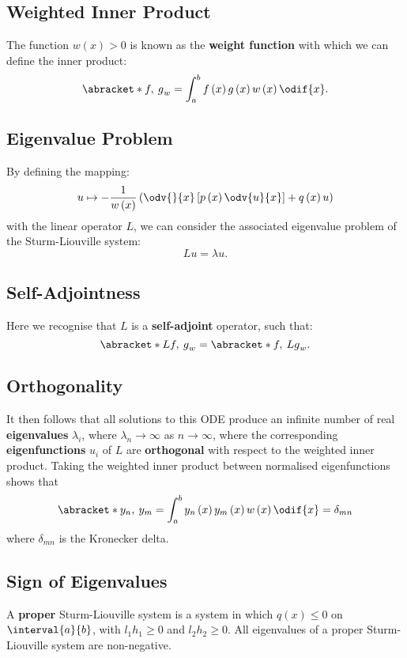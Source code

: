 \documentclass{article}
\begin{document}
\subsection{Weighted Inner Product}
The function \(w\left( x \right) > 0\) is known as the \textbf{weight
function} with which we can define the inner product:
\begin{equation*}
    \abracket*{f,\: g}_{w} = \int_a^b f\left( x \right) g\left( x \right) w\left( x \right) \odif{x}.
\end{equation*}
\subsection{Eigenvalue Problem}
By defining the mapping:
\begin{equation*}
    u \mapsto - \frac{1}{w\left( x \right)} \left( \odv{}{x} \left[ p\left( x \right) \odv{u}{x} \right] + q\left( x \right) u \right)
\end{equation*}
with the linear operator \(L\), we can consider the associated eigenvalue problem of
the Sturm-Liouville system:
\begin{equation*}
    L u = \lambda u.
\end{equation*}
\subsection{Self-Adjointness}
Here we recognise that \(L\) is a \textbf{self-adjoint} operator, such
that:
\begin{equation*}
    \abracket*{Lf,\: g}_{w} = \abracket*{f,\: Lg}_{w}.
\end{equation*}
\subsection{Orthogonality}
It then follows that all solutions to this ODE produce an infinite
number of real \textbf{eigenvalues} \(\lambda_i\), where \(\lambda_n
\to \infty\) as \(n \to \infty\), where the corresponding
\textbf{eigenfunctions} \(u_i\) of \(L\) are \textbf{orthogonal} with
respect to the weighted inner product. Taking the weighted inner
product between normalised eigenfunctions shows that
\begin{equation*}
    \abracket*{y_n,\: y_m} = \int_a^b y_n\left( x \right) y_m\left( x \right) w\left( x \right) \odif{x} = \delta_{mn}
\end{equation*}
where \(\delta_{mn}\) is the Kronecker delta.
\subsection{Sign of Eigenvalues}
A \textbf{proper} Sturm-Liouville system is a system in which \(q\left(
x \right) \leqslant 0\) on \(\interval{a}{b}\), with \(l_1h_1 \geqslant
0\) and \(l_2h_2 \geqslant 0\). All eigenvalues of a proper
Sturm-Liouville system are non-negative.
\end{document}
